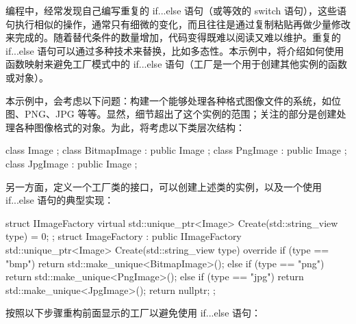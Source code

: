
编程中，经常发现自己编写重复的 if...else 语句（或等效的 switch 语句），这些语句执行相似的操作，通常只有细微的变化，而且往往是通过复制粘贴再做少量修改来完成的。随着替代条件的数量增加，代码变得既难以阅读又难以维护。重复的 if...else 语句可以通过多种技术来替换，比如多态性。本示例中，将介绍如何使用函数映射来避免工厂模式中的 if...else 语句（工厂是一个用于创建其他实例的函数或对象）。


本示例中，会考虑以下问题：构建一个能够处理各种格式图像文件的系统，如位图、PNG、JPG 等等。显然，细节超出了这个实例的范围；关注的部分是创建处理各种图像格式的对象。为此，将考虑以下类层次结构：

\begin{cpp}
class Image {};
class BitmapImage : public Image {};
class PngImage    : public Image {};
class JpgImage    : public Image {};
\end{cpp}

另一方面，定义一个工厂类的接口，可以创建上述类的实例，以及一个使用 if...else 语句的典型实现：

\begin{cpp}
struct IImageFactory
{
    virtual std::unique_ptr<Image> Create(std::string_view type) = 0;
};
struct ImageFactory : public IImageFactory
{
    std::unique_ptr<Image>
    Create(std::string_view type) override
    {
        if (type == "bmp")
            return std::make_unique<BitmapImage>();
        else if (type == "png")
            return std::make_unique<PngImage>();
        else if (type == "jpg")
            return std::make_unique<JpgImage>();
        return nullptr;
    }
};
\end{cpp}


按照以下步骤重构前面显示的工厂以避免使用 if...else 语句：


